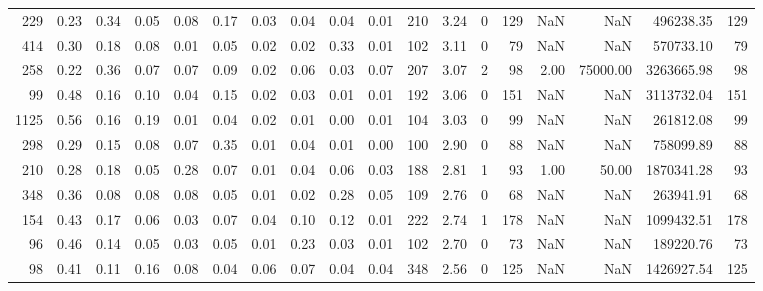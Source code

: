 \begin{tabular}{rrrrrrrrrrllrrrrrr}
          229 & 0.23 & 0.34 & 0.05 & 0.08 & 0.17 & 0.03 & 0.04 & 0.04 & 0.01 & 210 &  3.24 &                  0 &       129 &             NaN &                 NaN &     496238.35 &                   129 \\
          414 & 0.30 & 0.18 & 0.08 & 0.01 & 0.05 & 0.02 & 0.02 & 0.33 & 0.01 & 102 &  3.11 &                  0 &        79 &             NaN &                 NaN &     570733.10 &                    79 \\
          258 & 0.22 & 0.36 & 0.07 & 0.07 & 0.09 & 0.02 & 0.06 & 0.03 & 0.07 & 207 &  3.07 &                  2 &        98 &            2.00 &            75000.00 &    3263665.98 &                    98 \\
           99 & 0.48 & 0.16 & 0.10 & 0.04 & 0.15 & 0.02 & 0.03 & 0.01 & 0.01 & 192 &  3.06 &                  0 &       151 &             NaN &                 NaN &    3113732.04 &                   151 \\
         1125 & 0.56 & 0.16 & 0.19 & 0.01 & 0.04 & 0.02 & 0.01 & 0.00 & 0.01 & 104 &  3.03 &                  0 &        99 &             NaN &                 NaN &     261812.08 &                    99 \\
          298 & 0.29 & 0.15 & 0.08 & 0.07 & 0.35 & 0.01 & 0.04 & 0.01 & 0.00 & 100 &  2.90 &                  0 &        88 &             NaN &                 NaN &     758099.89 &                    88 \\
          210 & 0.28 & 0.18 & 0.05 & 0.28 & 0.07 & 0.01 & 0.04 & 0.06 & 0.03 & 188 &  2.81 &                  1 &        93 &            1.00 &               50.00 &    1870341.28 &                    93 \\
          348 & 0.36 & 0.08 & 0.08 & 0.08 & 0.05 & 0.01 & 0.02 & 0.28 & 0.05 & 109 &  2.76 &                  0 &        68 &             NaN &                 NaN &     263941.91 &                    68 \\
          154 & 0.43 & 0.17 & 0.06 & 0.03 & 0.07 & 0.04 & 0.10 & 0.12 & 0.01 & 222 &  2.74 &                  1 &       178 &             NaN &                 NaN &    1099432.51 &                   178 \\
           96 & 0.46 & 0.14 & 0.05 & 0.03 & 0.05 & 0.01 & 0.23 & 0.03 & 0.01 & 102 &  2.70 &                  0 &        73 &             NaN &                 NaN &     189220.76 &                    73 \\
           98 & 0.41 & 0.11 & 0.16 & 0.08 & 0.04 & 0.06 & 0.07 & 0.04 & 0.04 & 348 &  2.56 &                  0 &       125 &             NaN &                 NaN &    1426927.54 &                   125 \\

\end{tabular}
